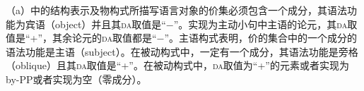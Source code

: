 （a）中的结构表示及物构式所描写语言对象的价集必须包含一个成分，其语法功能为宾语（object）并且其\textsc{da}取值是“$-$”。实现为主动小句中主语的论元，其\textsc{da}取值是“+”，其余论元的\textsc{da}取值都是“$-$”。主语构式表明，价的集合中的一个成分的语法功能是主语（subject）。在被动构式中，一定有一个成分，其语法功能是旁格（oblique）且其\textsc{da}取值是“+”。在被动构式中，\textsc{da}取值为“+”的元素或者实现为by-PP或者实现为空（零成分）。


